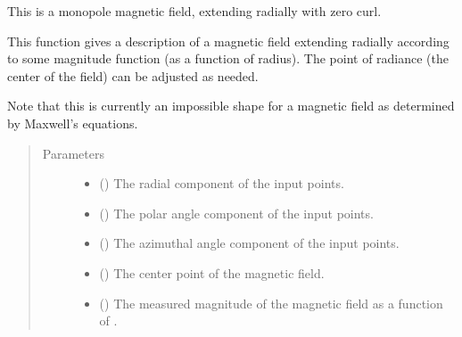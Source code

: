 \documentclass[letterpaper,10pt,english]{sphinxmanual}
\begin{document}
\begin{fulllineitems}
\label{\detokenize{magnetic_field_functions_3d:magnetic_field_functions_3d.monopole_magnetic_field_sphr_3d}}
This is a monopole magnetic field, extending radially with zero curl.

This function gives a description of a magnetic field extending radially
according to some magnitude function (as a function of radius). The
point of radiance (the center of the field) can be adjusted as needed.

Note that this is currently an impossible shape for a magnetic field as
determined by Maxwell’s equations.
\begin{quote}\begin{description}
\item[{Parameters}] \leavevmode\begin{itemize}
\item {} 
 () \textendash{} The radial component of the input points.

\item {} 
 () \textendash{} The polar angle component of the input points.

\item {} 
 () \textendash{} The azimuthal angle component of the input points.

\item {} 
 () \textendash{} The center point of the magnetic field.

\item {} 
 () \textendash{} The measured magnitude of the magnetic field as a function of .

\end{itemize}


\end{description}
\end{quote}
\end{fulllineitems}
\end{document}

